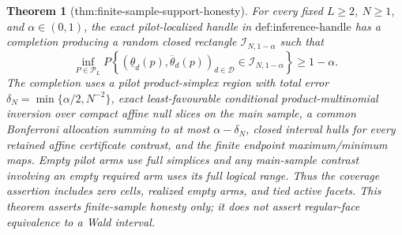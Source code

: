 \documentclass{article}
\newtheorem{theorem}{Theorem}
\begin{document}
\begin{theorem}[thm:finite-sample-support-honesty]\label{thm:finite-sample-support-honesty}
For every fixed \(L\ge2\), \(N\ge1\), and \(\alpha\in(0,1)\), the exact pilot-localized handle in \(\text{def:inference-handle}\) has a completion producing a random closed rectangle \(\mathcal I_{N,1-\alpha}\) such that
\[
 \inf_{P\in\mathcal P_L}P\left\{
 (\underline\theta_d(p),\overline\theta_d(p))_{d\in\mathcal D}
 \in\mathcal I_{N,1-\alpha}\right\}\ge1-\alpha.
\]
The completion uses a pilot product-simplex region with total error \(\delta_N=\min\{\alpha/2,N^{-2}\}\), exact least-favourable conditional product-multinomial inversion over compact affine null slices on the main sample, a common Bonferroni allocation summing to at most \(\alpha-\delta_N\), closed interval hulls for every retained affine certificate contrast, and the finite endpoint maximum/minimum maps.  Empty pilot arms use full simplices and any main-sample contrast involving an empty required arm uses its full logical range.  Thus the coverage assertion includes zero cells, realized empty arms, and tied active facets.  This theorem asserts finite-sample honesty only; it does not assert regular-face equivalence to a Wald interval.
\end{theorem}
\end{document}

